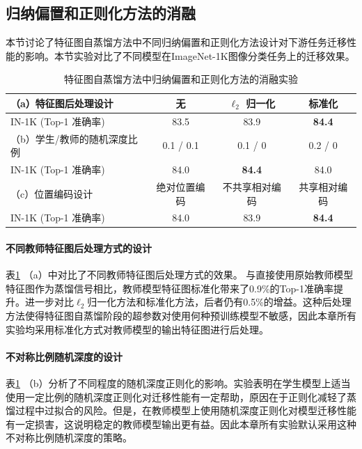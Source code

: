\subsection{归纳偏置和正则化方法的消融}
\label{sec:fd-exp-detail}
本节讨论了特征图自蒸馏方法中不同归纳偏置和正则化方法设计对下游任务迁移性能的影响。本节实验对比了不同模型在ImageNet-1K图像分类任务上的迁移效果。

\begin{table}
    \centering
    \caption{
    特征图自蒸馏方法中归纳偏置和正则化方法的消融实验}
    \begin{tabular}{lccc}
        \toprule
        （a）特征图后处理设计 & 无 & $\ell_2$ 归一化 & 标准化 \\
        \midrule
        IN-1K (Top-1 准确率) & 83.5 & 83.9 & \textbf{84.4} \\
        \midrule
        （b）学生/教师的随机深度比例 & 0.1 / 0.1 & 0.1 / 0 & 0.2 / 0  \\
        \midrule
        IN-1K (Top-1 准确率) & 84.0 & \textbf{84.4} & 84.0 \\
        \midrule
        （c）位置编码设计 & 绝对位置编码 & 不共享相对编码 & 共享相对编码 \\
        \midrule
        IN-1K (Top-1 准确率) & 84.0 & 83.9 & \textbf{84.4} \\
        \bottomrule
    \end{tabular}
    \label{tab:fd-ablation_tricks}
\end{table}

\paragraph{不同教师特征图后处理方式的设计} 表\ref{tab:fd-ablation_tricks} （a）中对比了不同教师特征图后处理方式的效果。
与直接使用原始教师模型特征图作为蒸馏信号相比，教师模型特征图标准化带来了0.9\%的Top-1准确率提升。进一步对比$\ell_{2}$归一化方法和标准化方法，后者仍有0.5\%的增益。这种后处理方法使得特征图自蒸馏阶段的超参数对使用何种预训练模型不敏感，因此本章所有实验均采用标准化方式对教师模型的输出特征图进行后处理。

\paragraph{不对称比例随机深度的设计} 表\ref{tab:fd-ablation_tricks} （b）分析了不同程度的随机深度正则化的影响。实验表明在学生模型上适当使用一定比例的随机深度正则化对迁移性能有一定帮助，原因在于正则化减轻了蒸馏过程中过拟合的风险。但是，在教师模型上使用随机深度正则化对模型迁移性能有一定损害，这说明稳定的教师模型输出更有益。因此本章所有实验默认采用这种不对称比例随机深度的策略。

